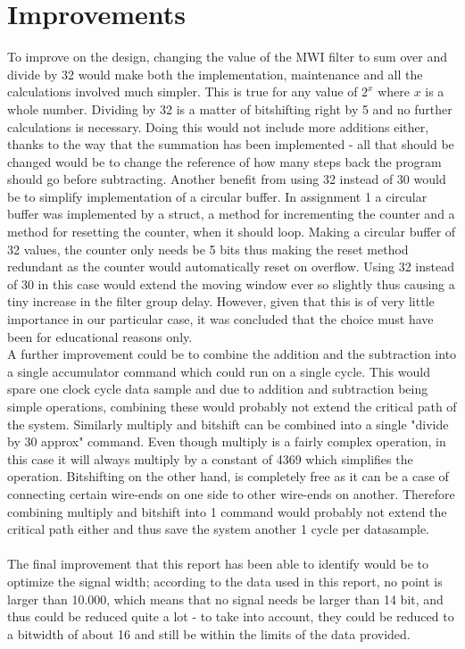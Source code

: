 \documentclass[12pt,a4paper]{article}
\begin{document}
\section{Improvements}
To improve on the design, changing the value of the MWI filter to sum over and divide by 32 would make both the implementation, maintenance and all the calculations involved much simpler. This is true for any value of $2^{x}$ where $x$ is a whole number. Dividing by 32 is a matter of bitshifting right by 5 and no further calculations is necessary. Doing this would not include more additions either, thanks to the way that the summation has been implemented - all that should be changed would be to change the reference of how many steps back the program should go before subtracting. Another benefit from using 32 instead of 30 would be to simplify implementation of a circular buffer. In assignment 1 a circular buffer was implemented by a struct, a method for incrementing the counter and a method for resetting the counter, when it should loop. Making a circular buffer of 32 values, the counter only needs be 5 bits thus making the reset method redundant as the counter would automatically reset on overflow.
Using 32 instead of 30 in this case would extend the moving window ever so slightly thus causing a tiny increase in the filter group delay. However, given that this is of very little importance in our particular case, it was concluded that the choice must have been for educational reasons only.
\\
A further improvement could be to combine the addition and the subtraction into a single accumulator command which could run on a single cycle. This would spare one clock cycle data sample and due to addition and subtraction being simple operations, combining these would probably not extend the critical path of the system. Similarly multiply and bitshift can be combined into a single "divide by 30 approx" command. Even though multiply is a fairly complex operation, in this case it will always multiply by a constant of 4369 which simplifies the operation. Bitshifting on the other hand, is completely free as it can be a case of connecting certain wire-ends on one side to other wire-ends on another. Therefore combining multiply and bitshift into 1 command would probably not extend the critical path either and thus save the system another 1 cycle per datasample.\\
\\
The final improvement that this report has been able to identify would be to optimize the signal width; according to the data used in this report, no point is larger than 10.000, which means that no signal needs be larger than 14 bit, and thus could be reduced quite a lot - to take into account, they could be reduced to a bitwidth of about 16 and still be within the limits of the data provided.\\
\end{document}
